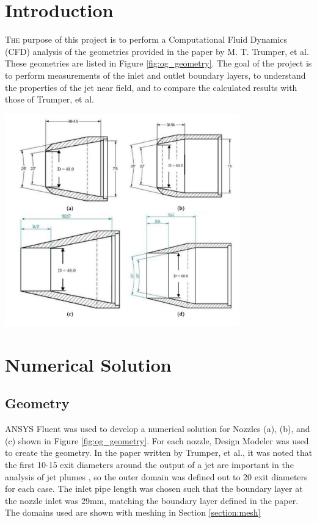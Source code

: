 \documentclass[12pt]{article} %
\begin{document}
\section{Introduction}
\lettrine{T}{he} purpose of this project is to perform a Computational Fluid Dynamics (CFD) analysis of the geometries provided in the paper by M. T. Trumper, et al. \cite{MilesT.Trumper2018IoNE} These geometries are listed in Figure \ref{fig:og_geometry}. The goal of the project is to perform measurements of the inlet and outlet boundary layers, to understand the properties of the jet near field, and to compare the calculated results with those of Trumper, et al.

\begin{center}
    \includegraphics[width = 4in]{OG_Geometry.PNG}
    \label{fig:og_geometry}
\end{center}

\section{Numerical Solution}
\subsection{Geometry}
ANSYS Fluent was used to develop a numerical solution for Nozzles (a), (b), and (c) shown in Figure \ref{fig:og_geometry}. For each nozzle, Design Modeler was used to create the geometry. In the paper written by Trumper, et al., it was noted that the first 10-15 exit diameters around the output of a jet are important in the analysis of jet plumes \cite{MilesT.Trumper2018IoNE}, so the outer domain was defined out to 20 exit diameters for each case. The inlet pipe length was chosen such that the boundary layer at the nozzle inlet was 29mm, matching the boundary layer defined in the paper. The domains used are shown with meshing in Section \ref{section:mesh}\par
\end{document}
